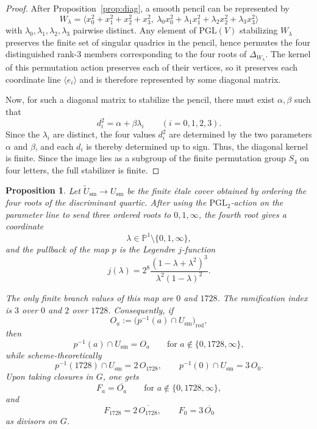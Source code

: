 \documentclass[11pt]{article}
\newtheorem{proposition}[theorem]{Proposition}
\newcommand{\Pj}{\mathbb P}
\newcommand{\PGL}{\mathrm{PGL}}
\begin{document}
\begin{proof}
After Proposition~\ref{prop:diag}, a smooth pencil can be represented by
\[
W_\lambda=
\Big\langle
x_0^2+x_1^2+x_2^2+x_3^2,\
\lambda_0x_0^2+\lambda_1x_1^2+\lambda_2x_2^2+\lambda_3x_3^2
\Big\rangle
\]
with $\lambda_0,\lambda_1,\lambda_2,\lambda_3$ pairwise distinct.
Any element of $\PGL(V)$ stabilizing $W_\lambda$ preserves the finite set of singular
quadrics in the pencil, hence permutes the four distinguished rank-$3$ members corresponding
to the four roots of $\Delta_{W_\lambda}$. The kernel of this permutation action preserves
each of their vertices, so it preserves each coordinate line $\langle e_i\rangle$ and is
therefore represented by some diagonal matrix.

Now, for such a diagonal matrix to stabilize the pencil, there must exist $\alpha,\beta$
such that
\[
d_i^2=\alpha+\beta\lambda_i \qquad (i=0,1,2,3).
\]
Since the $\lambda_i$ are distinct, the four values $d_i^2$ are determined by the two
parameters $\alpha$ and $\beta$, and each $d_i$ is thereby determined up to sign. Thus, the diagonal kernel is finite. Since the image lies as a subgroup of the finite permutation group $S_4$ on four letters, the full stabilizer is finite.
\end{proof}

\begin{proposition}\label{prop:CM-ramification}
Let $\widetilde U_{\mathrm{sm}}\to U_{\mathrm{sm}}$ be the finite \'etale cover obtained by
ordering the four roots of the discriminant quartic. After using the $\PGL_2$-action on the
parameter line to send three ordered roots to $0,1,\infty$, the fourth root gives a coordinate
\[
\lambda \in \Pj^1\setminus\{0,1,\infty\},
\]
and the pullback of the map $p$ is the Legendre $j$-function
\[
j(\lambda)=2^8\frac{(1-\lambda+\lambda^2)^3}{\lambda^2(1-\lambda)^2}.
\]

The only finite branch values of this map are $0$ and $1728$. The ramification index is
$3$ over $0$ and $2$ over $1728$. Consequently, if
\[
O_a := \bigl(p^{-1}(a)\cap U_{\mathrm{sm}}\bigr)_{\mathrm{red}},
\]
then
\[
p^{-1}(a)\cap U_{\mathrm{sm}} = O_a
\qquad\text{for } a\notin\{0,1728,\infty\},
\]
while scheme-theoretically
\[
p^{-1}(1728)\cap U_{\mathrm{sm}} = 2\,O_{1728},
\qquad
p^{-1}(0)\cap U_{\mathrm{sm}} = 3\,O_0.
\]
Upon taking closures in $G$, one gets
\[
F_a=\overline{O_a}
\qquad\text{for } a\notin\{0,1728,\infty\},
\]
and
\[
F_{1728}=2\,\overline{O_{1728}},
\qquad
F_0=3\,\overline{O_0}
\]
as divisors on $G$.
\end{proposition}
\end{document}
